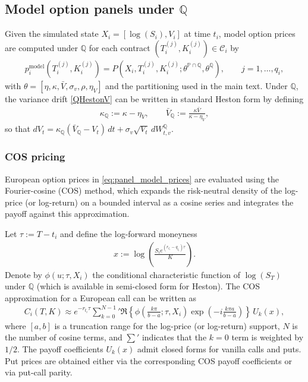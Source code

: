 \documentclass[11pt,a4paper,notitlepage]{article}
\numberwithin{equation}{section}
\begin{document}
\subsection{Model option panels under $\mathbb{Q}$}
Given the simulated state $X_i=[\log(S_i),V_i]$ at time $t_i$, model option prices are computed under
$\mathbb{Q}$ for each contract $(T_i^{(j)},K_i^{(j)})\in\mathcal{C}_i$ by
\begin{align}
p_{i}^{\mathrm{model}}(T_i^{(j)},K_i^{(j)})
= P\!\left(X_i,T_i^{(j)},K_i^{(j)};\theta^{\mathbb{P}\cap\mathbb{Q}},\theta^{\mathbb{Q}}\right),
\qquad j=1,\dots,q_i,
\label{eq:panel_model_prices}
\end{align}
with $\theta=[\eta,\kappa,\bar V,\sigma_v,\rho,\eta_V]$ and the partitioning used in the main text.
Under $\mathbb{Q}$, the variance drift \eqref{QHestonV} can be written in standard Heston form by defining
\begin{align}
\kappa_{\mathbb{Q}} := \kappa-\eta_V,
\qquad
\bar V_{\mathbb{Q}} := \frac{\kappa\bar V}{\kappa-\eta_V},
\end{align}
so that $dV_t=\kappa_{\mathbb{Q}}(\bar V_{\mathbb{Q}}-V_t)\,dt+\sigma_v\sqrt{V_t}\,dW^{\mathbb{Q}}_{t,v}$.

\subsubsection{COS pricing}
European option prices in \eqref{eq:panel_model_prices} are evaluated using the Fourier-cosine (COS)
method, which expands the risk-neutral density of the log-price (or log-return) on a bounded interval
as a cosine series and integrates the payoff against this approximation.

Let $\tau:=T-t_i$ and define the log-forward moneyness
\begin{align}
x:=\log\!\left(\frac{S_i e^{(r_{t_i}-q_{t_i})\tau}}{K}\right).
\end{align}
Denote by $\phi(u;\tau,X_i)$ the conditional characteristic function of $\log(S_T)$ under $\mathbb{Q}$
(which is available in semi-closed form for Heston). The COS approximation for a European call can be
written as
\begin{align}
C_i(T,K) \approx e^{-r_{t_i}\tau}\sum_{k=0}^{N-1}{}'
\Re\!\left\{\phi\!\left(\frac{k\pi}{b-a};\tau,X_i\right)\exp\!\left(-i\frac{k\pi a}{b-a}\right)\right\}
\,U_k(x),
\label{eq:COS_call}
\end{align}
where $[a,b]$ is a truncation range for the log-price (or log-return) support, $N$ is the number of cosine
terms, and $\sum'$ indicates that the $k=0$ term is weighted by $1/2$. The payoff coefficients $U_k(x)$
admit closed forms for vanilla calls and puts. Put prices are obtained either via the corresponding COS payoff
coefficients or via put-call parity.
\end{document}
